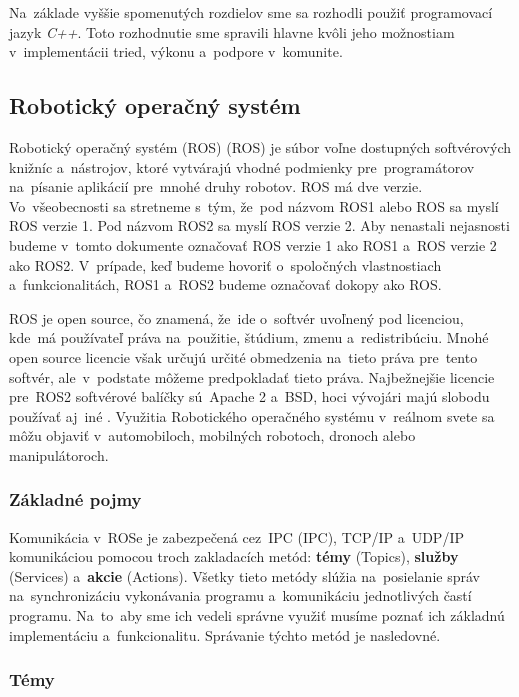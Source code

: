 Na~základe vyššie spomenutých rozdielov sme sa rozhodli použiť programovací jazyk \textit{C++}. Toto rozhodnutie sme spravili
hlavne kvôli jeho možnostiam v~implementácii tried, výkonu a~podpore v~komunite.

\subsection{Robotický operačný systém}
\label{sec:ros}

Robotický operačný systém (ROS) (\acrlong{ROS}) je súbor voľne dostupných softvérových knižníc a~nástrojov, ktoré vytvárajú
vhodné podmienky pre~programátorov na~písanie aplikácií pre~mnohé druhy robotov. ROS má dve verzie. Vo~všeobecnosti sa stretneme
s~tým, že~pod názvom ROS1 alebo ROS sa myslí ROS verzie 1. Pod názvom ROS2 sa myslí ROS verzie 2. Aby nenastali nejasnosti
budeme v~tomto dokumente označovať ROS verzie 1 ako ROS1 a~ROS verzie 2 ako ROS2. V~prípade, keď budeme hovoriť o~spoločných
vlastnostiach a~funkcionalitách, ROS1 a~ROS2 budeme označovať dokopy ako ROS.

ROS je open source, čo znamená, že~ide o~softvér uvoľnený pod licenciou, kde~má používateľ práva na~použitie,
štúdium, zmenu a~redistribúciu. Mnohé open source licencie však určujú určité obmedzenia na~tieto práva pre~tento softvér,
ale~v~podstate môžeme predpokladať tieto práva. Najbežnejšie licencie pre~ROS2 softvérové balíčky sú~Apache 2 a~BSD,
hoci vývojári majú slobodu používať aj~iné \cite{ROS2book}. Využitia Robotického operačného systému v~reálnom svete sa môžu
objaviť v~automobiloch, mobilných robotoch, dronoch alebo manipulátoroch.

\subsubsection{Základné pojmy}
\label{sec:zakladne_pojmy}

Komunikácia v~ROSe je zabezpečená cez~IPC (\acrlong{IPC}), TCP/IP a~UDP/IP komunikáciou pomocou troch zakladacích metód:
\textbf{témy} (Topics), \textbf{služby} (Services) a~\textbf{akcie} (Actions).
Všetky tieto metódy slúžia na~posielanie správ na~synchronizáciu vykonávania programu a~komunikáciu jednotlivých častí programu.
Na~to~aby sme ich vedeli správne využiť musíme poznať ich základnú implementáciu a~funkcionalitu. Správanie týchto metód je nasledovné.

\subsubsection{Témy}
\label{sec:topic}

